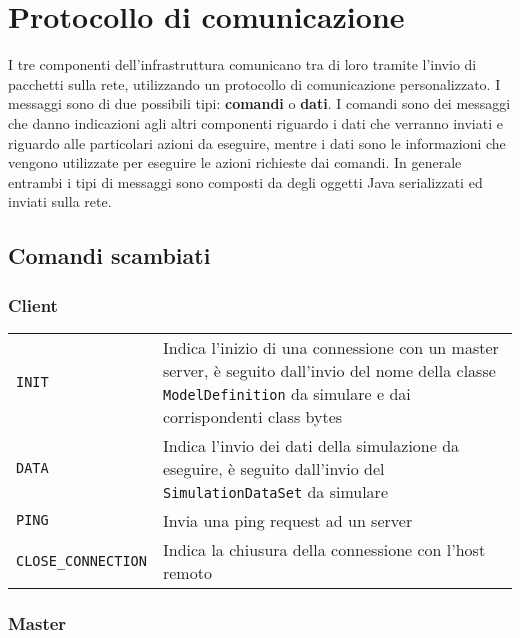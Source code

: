 
\section{Protocollo di comunicazione}

I tre componenti dell'infrastruttura comunicano tra di loro tramite l'invio di pacchetti sulla rete, utilizzando un protocollo di comunicazione personalizzato. 
I messaggi sono di due possibili tipi: \textbf{comandi} o \textbf{dati}. I comandi sono dei messaggi che danno indicazioni agli altri componenti riguardo i dati che verranno inviati e riguardo alle particolari azioni da eseguire, mentre i dati sono le informazioni che vengono utilizzate per eseguire le azioni richieste dai comandi. In generale entrambi i tipi di messaggi sono composti da degli oggetti Java serializzati ed inviati sulla rete.

\subsection{Comandi scambiati}

\subsubsection{Client}

\begin{table}[H]
    \begin{tabularx}{\linewidth}{ l X }
       \texttt{INIT}             & Indica l'inizio di una connessione con un master server, è seguito dall'invio del nome della classe \texttt{ModelDefinition} da simulare e dai corrispondenti class bytes \\
       \texttt{DATA}             & Indica l'invio dei dati della simulazione da eseguire, è seguito dall'invio del \texttt{SimulationDataSet} da simulare \\
       \texttt{PING}             & Invia una ping request ad un server \\
       \texttt{CLOSE\_CONNECTION} & Indica la chiusura della connessione con l'host remoto
    \end{tabularx}
\end{table}

\subsubsection{Master}

